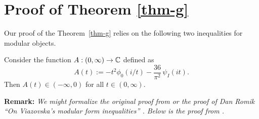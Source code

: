 \section{Proof of Theorem \ref{thm-g}}\label{sec: g}
Our proof of the Theorem~\ref{thm-g} relies on the following two inequalities for modular objects.
\begin{proposition}\label{prop: inequalities A}
Consider the function $A:(0,\infty)\to\mathbb{C}$ defined as
$$A(t):=-t^2\phi_0(i/t)-\frac{36}{\pi^2}\,\psi_I(it).$$
Then $A(t)\in(-\infty,0)$ for all $t\in(0,\infty).$
\end{proposition}

\noindent \textbf{Remark:} \emph{We might formalize the  original proof from \cite{Via2017} or the proof of Dan Romik ``On Viazovska’s modular form inequalities'' \cite{Romik2023}. Below is the proof from \cite{Via2017}.}
